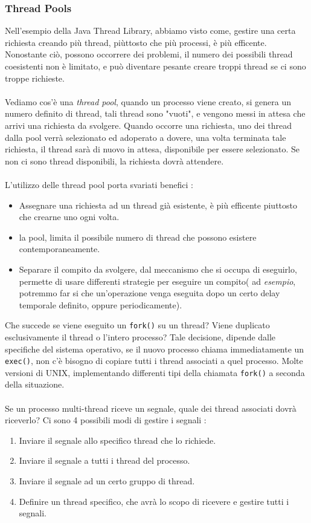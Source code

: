 \documentclass[12pt, letterpaper]{article}
\newcommand{\code}[1]{\colorbox{light-gray}{\texttt{#1}}}
\newcommand{\acc}{\\\hphantom{}\\}
\begin{document}
\subsubsection{Thread Pools}
Nell'esempio della Java Thread Library, abbiamo visto come, gestire una certa richiesta 
creando più thread, piùttosto che più processi, è più efficente. Nonostante ciò, 
possono occorrere dei problemi, il numero dei possibili thread coesistenti 
non è limitato, e può diventare pesante creare troppi thread se ci sono 
troppe richieste.\acc 
Vediamo cos'è una \textit{thread pool}, quando un processo viene creato, 
si genera un numero definito di thread, tali thread sono "vuoti", e vengono messi 
in attesa che arrivi una richiesta da svolgere. Quando occorre una richiesta, uno dei thread 
dalla pool verrà selezionato ed adoperato a dovere, una volta terminata tale richiesta, 
il thread sarà di nuovo in attesa, disponibile per essere selezionato. Se non ci sono 
thread disponibili,  la richiesta dovrà attendere.\acc 
L'utilizzo delle thread pool porta svariati benefici : \begin{itemize}
    \item Assegnare una richiesta ad un thread già esistente, è più 
    efficente piuttosto che crearne uno ogni volta.
    \item la pool, limita il possibile numero di thread che possono 
    esistere contemporaneamente.
    \item Separare il compito da svolgere, dal meccanismo che si occupa di 
    eseguirlo, permette di usare differenti strategie per eseguire un compito(
        ad \textit{esempio}, potremmo far si che un'operazione venga 
        eseguita dopo un certo delay temporale definito, oppure 
        periodicamente).
\end{itemize}
Che succede se viene eseguito un \code{fork()} su un thread? Viene duplicato 
esclusivamente il thread o l'intero processo? Tale decisione, dipende dalle 
specifiche del sistema operativo, se il nuovo processo chiama immediatamente 
un \code{exec()}, non c'è bisogno di copiare tutti i thread associati a quel 
processo. Molte versioni di UNIX, implementando differenti tipi della chiamata
\code{fork()} a seconda della situazione.\acc 
Se un processo multi-thread riceve un segnale, quale dei thread associati dovrà 
riceverlo? Ci sono 4 possibili modi di gestire i segnali : \begin{enumerate}
    \item Inviare il segnale allo specifico thread che lo richiede. 
    \item Inviare il segnale a tutti i thread del processo.
    \item Inviare il segnale ad un certo gruppo di thread.
    \item Definire un thread specifico, che avrà lo scopo di 
    ricevere e gestire tutti i segnali.
\end{enumerate}
\end{document}
